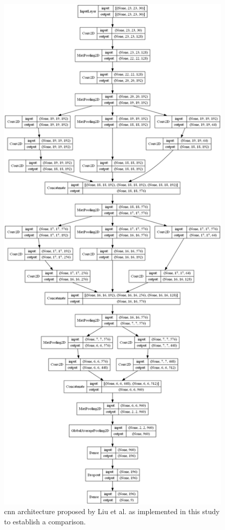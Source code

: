 \begin{figure}[ht]
    \centering
    \includegraphics[width=\linewidth]{figs/vineyard_classification/networks/lt_cnn_23x22_64.png}
	\caption{\acrshort{cnn} architecture proposed by Liu et al. \cite{liu_plant_2022} as implemented in this study to establish a comparison. }
	\label{fig:lt_cnn}
\end{figure}


